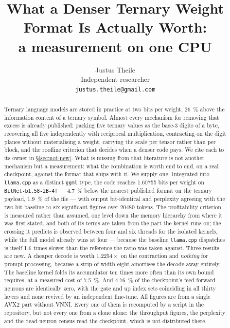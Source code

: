 \documentclass[11pt,a4paper]{article}
\title{What a Denser Ternary Weight Format Is Actually Worth:\\
       a measurement on one CPU}
\author{Justus Theile\\
  \small Independent researcher\\
  \small \texttt{justus.theile@gmail.com}}
\date{}
\newcommand{\code}[1]{\texttt{#1}}
\begin{document}
\maketitle

\begin{abstract}
Ternary language models are stored in practice at two bits per weight,
\SI{26}{\percent} above the information content of a ternary symbol. Almost
every mechanism for removing that excess is already published: packing five
ternary values as the base-3 digits of a byte, recovering all five
independently with reciprocal multiplication, contracting on the digit planes
without materialising a weight, carrying the scale per tensor rather than per
block, and the roofline criterion that decides when a denser code pays. We cite
each to its owner in \S\ref{sec:not-new}. What is missing from that literature
is not another mechanism but a measurement: what the combination is worth end to
end, on a real checkpoint, against the format that ships with it. We supply one.
Integrated into \code{llama.cpp} as a distinct \code{ggml} type, the code reaches
\num{1.60755} bits per weight on \code{BitNet-b1.58-2B-4T} --- \SI{4.7}{\percent}
below the nearest published format on the ternary payload,
\SI{1.9}{\percent} of the file --- with output bit-identical and perplexity
agreeing with the two-bit baseline to six significant figures over
\num{20480} tokens. The profitability criterion is measured rather than assumed,
one level down the memory hierarchy from where it was first stated, and both of
its terms are taken from the part the kernel runs on; the crossing it predicts
is observed between four and six threads for the isolated kernels, while the
full model already wins at four --- because the baseline \code{llama.cpp}
dispatches is itself \num{1.6} times slower than the reference the ratio was
taken against. Three results are new. A cheaper
decode is worth $\num{1.2254}\times$ on the contraction and \emph{nothing} for
prompt processing, because a strip of width eight amortises the decode away
entirely. The baseline kernel folds its accumulator ten times more often than
its own bound requires, at a measured cost of \SI{7.5}{\percent}. And
\SI{4.76}{\percent} of the checkpoint's feed-forward neurons are identically
zero, with the gate and up index sets coinciding in all thirty layers and none
revived by an independent fine-tune. All figures are from a single AVX2 part
without VNNI. Every one of them is recomputed by a script in the repository,
but not every one from a clone alone: the throughput figures, the perplexity
and the dead-neuron census read the checkpoint, which is not distributed there.
\end{abstract}
\end{document}
